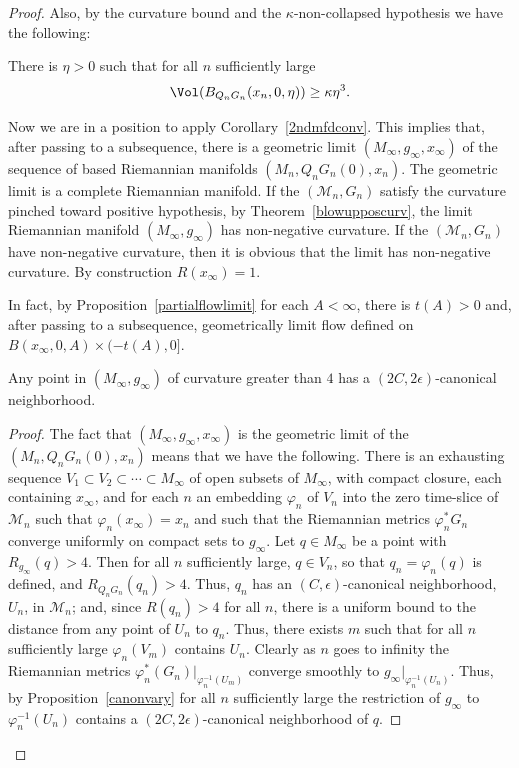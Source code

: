 \begin{proof}
Also, by the curvature bound and  the $\kappa$-non-collapsed
hypothesis we have the following:

\begin{claim}
\label{claim:volume-noncollapsing-blowup}
There is $\eta>0$ such that for all $n$ sufficiently large
$$\Vol(B_{Q_nG_n}(x_n,0,\eta))\ge \kappa\eta^3.$$
\end{claim}

Now we are in a position to apply Corollary~\ref{2ndmfdconv}. This
implies that, after passing to a subsequence, there is a geometric
limit $(M_\infty,g_\infty,x_\infty)$ of the sequence of based
Riemannian manifolds $(M_n,Q_nG_n(0),x_n)$. The geometric limit is a
complete Riemannian manifold. If the $({\mathcal M}_n,G_n)$ satisfy
the curvature pinched toward positive hypothesis, by
Theorem~\ref{blowupposcurv}, the limit Riemannian manifold
$(M_\infty,g_\infty)$ has non-negative curvature. If the $({\mathcal
M}_n,G_n)$ have non-negative curvature, then it is obvious that the
limit has non-negative curvature. By construction $R(x_\infty)=1$.

In fact, by Proposition~\ref{partialflowlimit} for each $A<\infty$,
there is $t(A)>0$ and, after passing to a subsequence, geometrically
limit flow defined on $B(x_\infty,0,A)\times (-t(A),0]$.


\begin{claim}
\label{claim:canonical-neighborhood-persists}
Any point in $(M_\infty,g_\infty)$ of curvature greater than $4$ has
a $(2C,2\epsilon)$-canonical neighborhood.
\end{claim}


\begin{proof}
The fact that $(M_\infty,g_\infty,x_\infty)$ is the geometric limit
of the $(M_n,Q_nG_n(0),x_n)$ means that we have the following. There
is an exhausting sequence  $V_1\subset V_2\subset\cdots \subset
M_\infty$ of open subsets of $M_\infty$, with compact closure, each
containing $x_\infty$, and for each $n$  an embedding $\varphi_n$ of
$V_n$ into the zero time-slice of ${\mathcal M}_n$ such that
$\varphi_n(x_\infty)=x_n$ and such that the Riemannian metrics
$\varphi_n^*G_n$ converge uniformly on compact sets to $g_\infty$.
Let $q\in M_\infty$ be a point with $R_{g_\infty}(q)>4$. Then for
all $n$ sufficiently large, $q\in V_n$, so that $q_n=\varphi_n(q)$
is defined, and $R_{Q_nG_n}(q_n)>4$. Thus, $q_n$ has an
$(C,\epsilon)$-canonical neighborhood, $U_n$, in ${\mathcal M}_n$;
and, since $R(q_n)>4$ for all $n$,  there is a uniform bound to the
distance from any point of $U_n$ to $q_n$. Thus, there exists $m$
such that for all $n$ sufficiently large $\varphi_n(V_m)$ contains
$U_n$. Clearly as $n$ goes to infinity the Riemannian metrics
$\varphi_n^*(G_n)|_{\varphi_n^{-1}(U_m)}$ converge smoothly to
$g_\infty|_{\varphi_n^{-1}(U_n)}$. Thus, by
Proposition~\ref{canonvary} for all $n$ sufficiently large the
restriction of $g_\infty$ to $\varphi_n^{-1}(U_n)$ contains a
$(2C,2\epsilon)$-canonical neighborhood of $q$.
\end{proof}


\end{proof}

